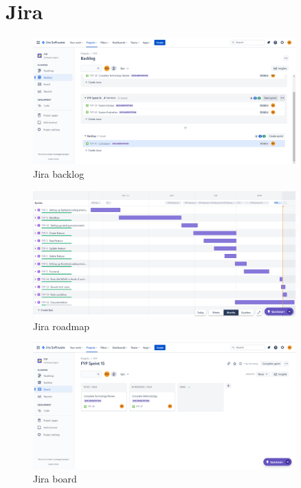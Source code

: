 \appendix

\chapter{Jira}\label{appendix:jira}
\begin{figure}[h!]
    \centering
    \includegraphics[width=0.9\textwidth]{images/backlog.png}
    \caption{Jira backlog}
    \label{image:backlog}
\end{figure}

\begin{figure}[h!]
    \centering
    \includegraphics[width=0.9\textwidth]{images/roadmap.png}
    \caption{Jira roadmap}
    \label{image:roadmap}
\end{figure}

\begin{figure}[h!]
    \centering
    \includegraphics[width=0.9\textwidth]{images/board.png}
    \caption{Jira board}
    \label{image:board}
\end{figure}

